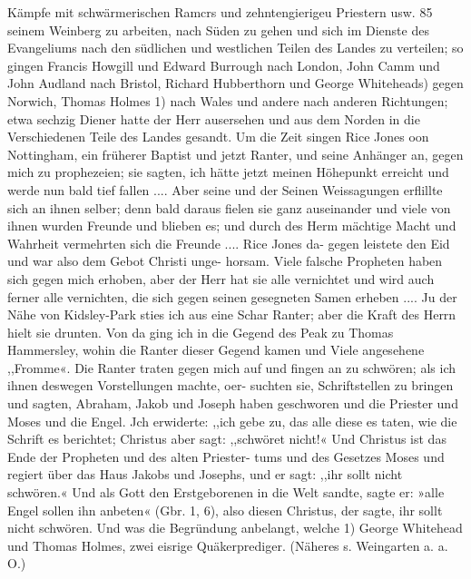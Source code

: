 Kämpfe mit schwärmerischen Ramcrs und zehntengierigeu Priestern usw. 85
seinem Weinberg zu arbeiten, nach Süden zu gehen und sich im
Dienste des Evangeliums nach den südlichen und westlichen Teilen
des Landes zu verteilen; so gingen Francis Howgill und Edward
Burrough nach London, John Camm und John Audland nach
Bristol, Richard Hubberthorn und George Whiteheads) gegen
Norwich, Thomas Holmes 1) nach Wales und andere nach anderen
Richtungen; etwa sechzig Diener hatte der Herr ausersehen und
aus dem Norden in die Verschiedenen Teile des Landes gesandt.
Um die Zeit singen Rice Jones oon Nottingham, ein früherer
Baptist und jetzt Ranter, und seine Anhänger an, gegen mich
zu prophezeien; sie sagten, ich hätte jetzt meinen Höhepunkt
erreicht und werde nun bald tief fallen .... Aber seine und
der Seinen Weissagungen erflillte sich an ihnen selber; denn bald
daraus fielen sie ganz auseinander und viele von ihnen wurden
Freunde und blieben es; und durch des Herm mächtige Macht und
Wahrheit vermehrten sich die Freunde .... Rice Jones da-
gegen leistete den Eid und war also dem Gebot Christi unge-
horsam. Viele falsche Propheten haben sich gegen mich erhoben,
aber der Herr hat sie alle vernichtet und wird auch ferner alle
vernichten, die sich gegen seinen gesegneten Samen erheben ....
Ju der Nähe von Kidsley-Park sties ich aus eine Schar
Ranter; aber die Kraft des Herrn hielt sie drunten. Von da
ging ich in die Gegend des Peak zu Thomas Hammersley,
wohin die Ranter dieser Gegend kamen und Viele angesehene
,,Fromme«. Die Ranter traten gegen mich auf und fingen an
zu schwören; als ich ihnen deswegen Vorstellungen machte, oer-
suchten sie, Schriftstellen zu bringen und sagten, Abraham, Jakob
und Joseph haben geschworen und die Priester und Moses und
die Engel. Jch erwiderte: ,,ich gebe zu, das alle diese es taten,
wie die Schrift es berichtet; Christus aber sagt: ,,schwöret nicht!«
Und Christus ist das Ende der Propheten und des alten Priester-
tums und des Gesetzes Moses und regiert über das Haus Jakobs
und Josephs, und er sagt: ,,ihr sollt nicht schwören.« Und als
Gott den Erstgeborenen in die Welt sandte, sagte er: »alle Engel
sollen ihn anbeten« (Gbr. 1, 6), also diesen Christus, der sagte, ihr
sollt nicht schwören. Und was die Begründung anbelangt, welche
1) George Whitehead und Thomas Holmes, zwei eisrige Quäkerprediger.
(Näheres s. Weingarten a. a. O.)


